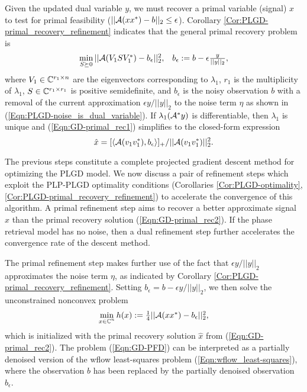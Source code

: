Given the updated dual variable $y$, we must recover a primal variable (signal) $x$ to test for primal feasibility ($|| {\mathcal A} (xx^*) - b ||_2 \leq \epsilon$).  Corollary \ref{Cor:PLGD-primal_recovery_refinement} indicates that the general primal recovery problem is
\begin{equation} 	\label{Eqn:GD-primal_rec1}
\begin{array}{lr}
\min\limits_{\substack{S \succeq 0}}	|| {\mathcal A}(V_1 S V_1^*) - b_\epsilon ||_2^2,
	& 	b_\epsilon := b - \epsilon \frac{y}{||y||_2},
\end{array}
\end{equation}
where $V_1 \in {\mathbb C}^{r_1 \times n}$ are the eigenvectors corresponding to $\lambda_1$, $r_1$ is the multiplicity of $\lambda_1$, $S \in {\mathbb C}^{r_1 \times r_1}$ is positive semidefinite, and $b_\epsilon$ is the noisy observation $b$ with a removal of the current approximation $\epsilon y / ||y||_2$ to the noise term $\eta$ as shown in (\ref{Eqn:PLGD-noise_is_dual_variable}).  If $ \lambda_1({\mathcal A}^* y)$ is differentiable, then $\lambda_1$ is unique and (\ref{Eqn:GD-primal_rec1}) simplifies to the closed-form expression
\begin{equation} 	\label{Eqn:GD-primal_rec2}
\hat{x} = [ \langle {\mathcal A}(v_1v_1^*), b_\epsilon \rangle ]_+ / || {\mathcal A}(v_1v_1^*)||_2^2.
\end{equation}






The previous steps constitute a complete projected gradient descent method for optimizing the PLGD model.  We now discuss a pair of refinement steps which exploit the PLP-PLGD optimality conditions (Corollaries \ref{Cor:PLGD-optimality}, \ref{Cor:PLGD-primal_recovery_refinement}) to accelerate the convergence of this algorithm.  A primal refinement step aims to recover a better approximate signal $x$ than the primal recovery solution (\ref{Eqn:GD-primal_rec2}).  If the phase retrieval model has no noise, then a dual refinement step further accelerates the convergence rate of the descent method.  





The primal refinement step makes further use of the fact that $\epsilon y / ||y||_2$ approximates the noise term $\eta$, as indicated by Corollary \ref{Cor:PLGD-primal_recovery_refinement}.  Setting $b_\epsilon = b - \epsilon y / ||y||_2$, we then solve the unconstrained nonconvex problem
\begin{equation}	\label{Eqn:GD-PFD}
\begin{array}{l}
\min\limits_{\substack{x \in {\mathbb C}^n}} h(x) := \frac{1}{4}|| {\mathcal A}(x x^*) - b_\epsilon
||_2^2,
\end{array}
\end{equation}
which is initialized with the primal recovery solution $\hat{x}$ from (\ref{Eqn:GD-primal_rec2}).  The problem (\ref{Eqn:GD-PFD}) can be interpreted as a partially denoised version of the wflow least-squares problem (\ref{Eqn:wflow_least-squares}), where the observation $b$ has been replaced by the partially denoised observation $b_\epsilon$.




